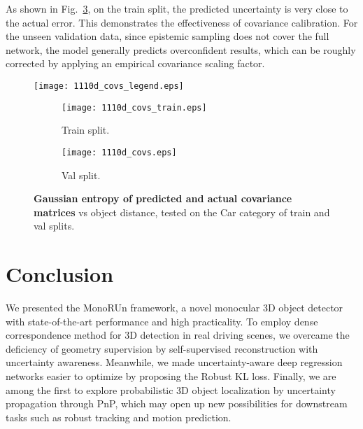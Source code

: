 \documentclass[10pt,twocolumn,letterpaper]{article}
\begin{document}
As shown in Fig.~\ref{fig:entropy}, on the train split, the predicted uncertainty is very close to the actual error. This demonstrates the effectiveness of covariance calibration. For the unseen validation data, since epistemic sampling does not cover the full network, the model generally predicts overconfident results, which can be roughly corrected by applying an empirical covariance scaling factor.

\begin{figure}[t]
  \vspace*{-3mm}
\begin{center}
    \texttt{[image: 1110d\_covs\_legend.eps]}
\end{center}
\end{figure}

\begin{figure}
  \vspace*{-6.9mm}
  \begin{subfigure}[b]{0.5\linewidth}
    \texttt{[image: 1110d\_covs\_train.eps]}
    \vspace*{-5.5mm}
    \caption{Train split.} \label{fig:entropy_a}
  \end{subfigure}\hspace*{\fill}
  \begin{subfigure}[b]{0.5\linewidth}
    \texttt{[image: 1110d\_covs.eps]}
    \vspace*{-5.5mm}
    \caption{Val split.} \label{fig:entropy_b}
  \end{subfigure}\caption{\textbf{Gaussian entropy of predicted and actual covariance matrices} vs object distance, tested on the Car category of train and val splits.} \label{fig:entropy}
\end{figure}

\section{Conclusion}
We presented the MonoRUn framework, a novel monocular 3D object detector with state-of-the-art performance and high practicality. To employ dense correspondence method for 3D detection in real driving scenes, we overcame the deficiency of geometry supervision by self-supervised reconstruction with uncertainty awareness. Meanwhile, we made uncertainty-aware deep regression networks easier to optimize by proposing the Robust KL loss. Finally, we are among the first to explore probabilistic 3D object localization by uncertainty propagation through PnP, which may open up new possibilities for downstream tasks such as robust tracking and motion prediction.
\end{document}

